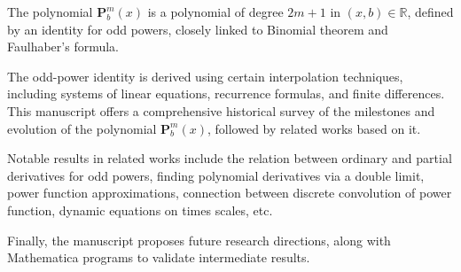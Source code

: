 The polynomial $\mathbf{P}^m_b(x)$ is a polynomial of degree $2m+1$ in $(x,b) \in \mathbb{R}$,
defined by an identity for odd powers, closely linked to Binomial theorem and Faulhaber's formula.

The odd-power identity is derived using certain interpolation techniques,
including systems of linear equations, recurrence formulas, and finite differences.
This manuscript offers a comprehensive historical survey of the milestones and evolution
of the polynomial $\mathbf{P}^m_b(x)$, followed by related works based on it.

Notable results in related works include the relation between ordinary and partial derivatives
for odd powers, finding polynomial derivatives via a double limit, power function approximations,
connection between discrete convolution of power function, dynamic equations on times scales, etc.

Finally, the manuscript proposes future research directions,
along with Mathematica programs to validate intermediate results.
